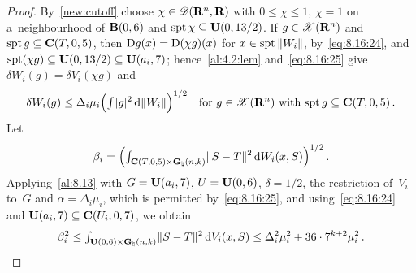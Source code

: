\begin{proof}
    By~\ref{new:cutoff} choose $\chi \in \mathscr{D}(\mathbf{R}^{n},\mathbf{R})$ with $0 \le \chi \le 1$, $\chi =
    1$ on a~neighbourhood of $\mathbf{B}(0,6)$ and $\operatorname{spt} \chi \subseteq \mathbf{U}(0,13/2)$. If $g \in
    \mathscr{X}(\mathbf{R}^{n})$ and $\operatorname{spt} g \subseteq \mathbf{C} ( T, 0, 5 )$, then $\mathrm{D} g(x) = \mathrm{D}(\chi g)(x)$ for
    $x \in \operatorname{spt} \|W_i\|$, by~\eqref{eq:8.16:24}, and $\operatorname{spt} (\chi g) \subseteq \mathbf{U}(0,13/2)
    \subseteq \mathbf{U}(a_i,7)$; hence~\ref{al:4.2:lem} and~\eqref{eq:8.16:25} give $\delta W_i(g) =
    \delta V_i(\chi g)$ and
    \begin{equation}
        \label{eq:8.16:25a}
        \delta W_i(g) \le \Delta_i \mu_i \Big( {\textstyle\int_{}^{}} |g|^2 \,\mathrm{d} \|W_i\| \Big)^{1/2} \quad
        \text{for $g \in \mathscr{X}(\mathbf{R}^{n})$ with $\operatorname{spt} g \subseteq \mathbf{C} ( T, 0, 5 )$} \,.
    \end{equation}
    Let
    \begin{displaymath}
        \beta_i = \Big( {\textstyle\int_{\mathbf{C} ( T, 0, 5 ) \times \mathbf{G}_{\natural}(n,k)}^{}} \|S - T\|^2 \,\mathrm{d}
        W_i(x,S) \Big)^{1/2} \,.
    \end{displaymath}
    Applying~\ref{al:8.13} with $G = \mathbf{U}(a_i,7)$, $U = \mathbf{U}(0,6)$, $\delta = 1/2$, the
    restriction of~$V_i$ to~$G$ and $\alpha = \Delta_i \mu_i$, which is permitted
    by~\eqref{eq:8.16:25}, and using~\eqref{eq:8.16:24} and $\mathbf{U}(a_i,7) \subseteq
    \mathbf{C} ( U_i, 0, 7 )$, we obtain
    \begin{displaymath}
        \beta_i^2 \le {\textstyle\int_{\mathbf{U}(0,6) \times \mathbf{G}_{\natural}(n,k)}^{}} \|S - T\|^2 \,\mathrm{d} V_i(x,S)
        \le \Delta_i^2 \mu_i^2 + 36 \cdot 7^{k+2} \mu_i^2 \,.
    \end{displaymath}


\end{proof}
